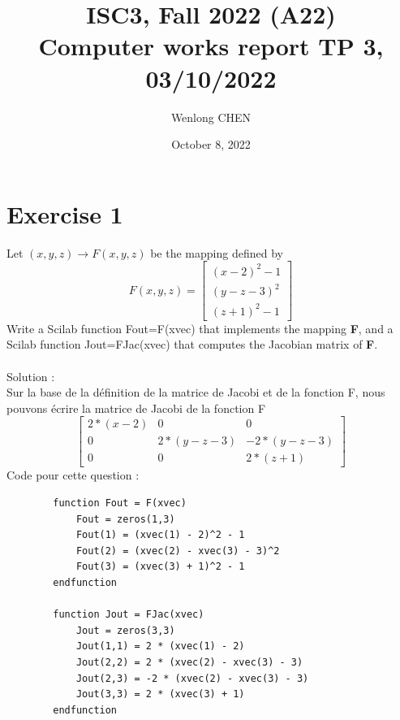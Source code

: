 \documentclass[11pt]{article}
\title{ISC3, Fall 2022 (A22) \\
 Computer works report TP 3, 03/10/2022}
\author{Wenlong CHEN}
\date{October 8, 2022}
\begin{document}
    \maketitle
    \section*{Exercise 1}
    Let $(x,y,z) \rightarrow F(x,y,z)$ be the mapping defined by
    $$
    F(x,y,z)=
    \begin{bmatrix}
        (x-2)^2-1 \\
        (y-z-3)^2 \\
        (z+1)^2-1
    \end{bmatrix}
    $$
    Write a Scilab function Fout=F(xvec) that implements the mapping \textbf{F}, and a Scilab function Jout=FJac(xvec) that computes the Jacobian matrix of \textbf{F}.\\
    ~\\
    Solution : \\
    Sur la base de la définition de la matrice de Jacobi et de la fonction F, nous pouvons écrire la matrice de Jacobi de la fonction F
    $$
    \begin{bmatrix}
        2*(x-2) & 0 & 0 \\
        0 & 2*(y-z-3) & -2*(y-z-3) \\
        0 & 0 & 2*(z+1)
    \end{bmatrix}
    $$
    Code pour cette question : 
    \begin{verbatim}
        function Fout = F(xvec)
            Fout = zeros(1,3)
            Fout(1) = (xvec(1) - 2)^2 - 1
            Fout(2) = (xvec(2) - xvec(3) - 3)^2
            Fout(3) = (xvec(3) + 1)^2 - 1
        endfunction

        function Jout = FJac(xvec)
            Jout = zeros(3,3)
            Jout(1,1) = 2 * (xvec(1) - 2)
            Jout(2,2) = 2 * (xvec(2) - xvec(3) - 3)
            Jout(2,3) = -2 * (xvec(2) - xvec(3) - 3)
            Jout(3,3) = 2 * (xvec(3) + 1)
        endfunction
    \end{verbatim}
    ~\\
\end{document}
